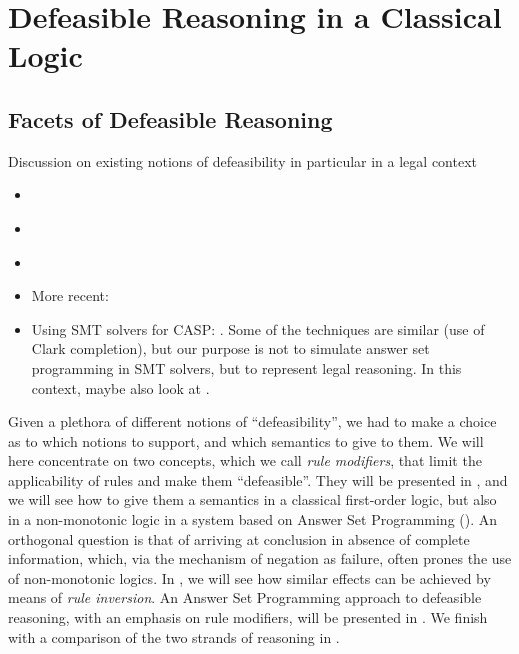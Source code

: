 \section{Defeasible Reasoning in a Classical Logic}\label{sec:defeasible_classical}

\subsection{Facets of Defeasible Reasoning}\label{sec:facets}

\begin{tcolorbox}[title=To be done]
Discussion on existing notions of defeasibility in particular in a legal context
\begin{itemize}
\item \cite{hart_concept_of_law_1997}
\item \cite{alchourron_makinson_hierarchies_of_regulations_1981}
\item \cite{hage_law_and_defeasibility_2003}
\item More recent: \cite{governatori21:_unrav_legal_refer_defeas_deont_logic}
\item Using SMT solvers for CASP:
  \cite{shen_lierler_smt_answer_set_kr_2018}. Some of the techniques are
  similar (use of Clark completion), but our purpose is not to simulate answer
  set programming in SMT solvers, but to represent legal reasoning. In this
  context, maybe also look at \cite{fages_consistency_clark_completion_1994}.
\end{itemize}
\end{tcolorbox}

Given a plethora of different notions of ``defeasibility'', we had to make a
choice as to which notions to support, and which semantics to give to them. We
will here concentrate on two concepts, which we call \emph{rule modifiers},
that limit the applicability of rules and make them ``defeasible''. They will
be presented in , and we will see how to give
them a semantics in a classical first-order logic, but also in a non-monotonic
logic in a system based on Answer Set Programming
(). An orthogonal question is that of
arriving at conclusion in absence of complete information, which, via the
mechanism of negation as  failure, often prones the use of
non-monotonic logics. In , we will see how similar
effects can be achieved by means of \emph{rule inversion}. An Answer Set
Programming approach to defeasible reasoning, with an emphasis on rule
modifiers, will be presented in . We finish
with a comparison of the two strands of reasoning in .


